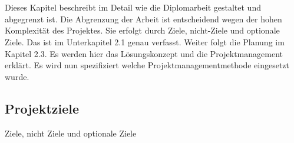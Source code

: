 \chapter{\docname}
\label{\docname}
Dieses Kapitel beschreibt im Detail wie die Diplomarbeit gestaltet und abgegrenzt ist. Die Abgrenzung der Arbeit ist entscheidend wegen der hohen Komplexität des Projektes. Sie erfolgt durch Ziele, nicht-Ziele und optionale Ziele. Das ist im Unterkapitel 2.1 genau verfasst. 
Weiter folgt die Planung im Kapitel 2.3. Es werden hier das Lösungskonzept und die Projektmanagement erklärt. Es wird nun spezifiziert welche Projektmanagementmethode eingesetzt wurde.
\newcommand{\autor}{Rei Hoxha}
\section{Projektziele}
Ziele, nicht Ziele und optionale Ziele
